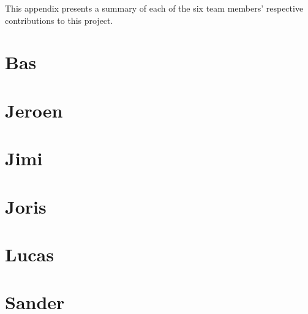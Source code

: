 This appendix presents a summary of each of the six team members' respective
contributions to this project.


\section{Bas}


\section{Jeroen}


\section{Jimi}


\section{Joris}


\section{Lucas}


\section{Sander}
